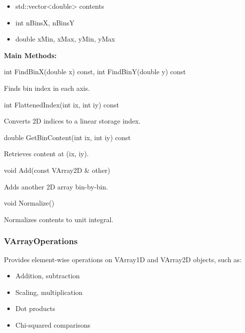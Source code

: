 \begin{itemize}
  \item {\color{amber}std::vector<double>} contents
  \item {\color{amber}int} nBinsX, nBinsY
  \item {\color{amber}double} xMin, xMax, yMin, yMax
\end{itemize}

\vspace{0.5em}
\noindent\textbf{Main Methods:}

\begin{description}[align=left]

  \item[] {\color{cadmiumred} int FindBinX(double x) const}, {\color{cadmiumred} int FindBinY(double y) const}

  Finds bin index in each axis.

  \item[] {\color{cadmiumred} int FlattenedIndex(int ix, int iy) const}

  Converts 2D indices to a linear storage index.

  \item[] {\color{cadmiumred} double GetBinContent(int ix, int iy) const}

  Retrieves content at {\color{amber}(ix, iy)}.

  \item[] {\color{cadmiumred} void Add(const VArray2D \& other)}

  Adds another 2D array bin-by-bin.

  \item[] {\color{cadmiumred} void Normalize()}

  Normalizes contents to unit integral.

\end{description}

\vspace{1em}
\subsubsection*{\color{cadmiumgreen}\bf VArrayOperations}

Provides element-wise operations on {\color{cadmiumgreen} VArray1D} and {\color{cadmiumgreen} VArray2D} objects, such as:

\begin{itemize}
  \item Addition, subtraction
  \item Scaling, multiplication
  \item Dot products
  \item Chi-squared comparisons
\end{itemize}

